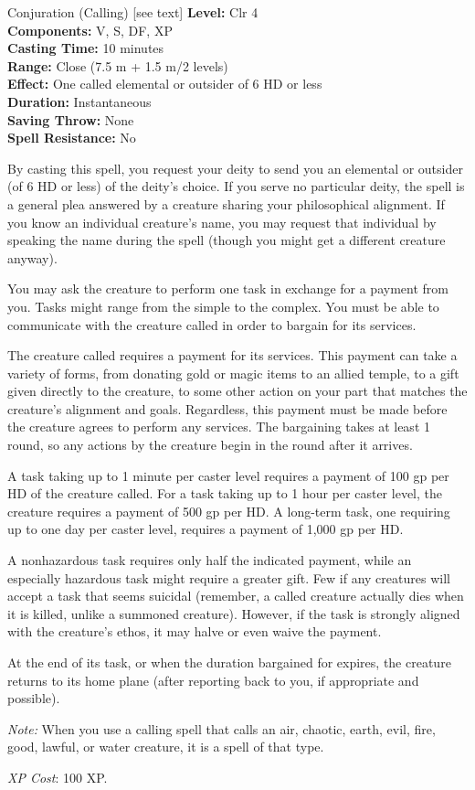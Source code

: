 {Conjuration (Calling) [see text]}
{
	\textbf{Level:}
	Clr 4\\
	\textbf{Components:}
	V, S, DF, XP\\
	\textbf{Casting Time:}
	10 minutes\\
	\textbf{Range:}
	Close (7.5 m + 1.5 m/2 levels)\\
	\textbf{Effect:}
	One called elemental or outsider of 6 HD or less\\
	\textbf{Duration:}
	Instantaneous\\
	\textbf{Saving Throw:}
	None\\
	\textbf{Spell Resistance:}
	No\\
}
{
	By casting this spell, you request your deity to send you an elemental or outsider (of 6 HD or less) of the deity's choice. If you serve no particular deity, the spell is a general plea answered by a creature sharing your philosophical alignment. If you know an individual creature's name, you may request that individual by speaking the name during the spell (though you might get a different creature anyway).

	You may ask the creature to perform one task in exchange for a payment from you. Tasks might range from the simple to the complex. You must be able to communicate with the creature called in order to bargain for its services.

	The creature called requires a payment for its services. This payment can take a variety of forms, from donating gold or magic items to an allied temple, to a gift given directly to the creature, to some other action on your part that matches the creature's alignment and goals. Regardless, this payment must be made before the creature agrees to perform any services. The bargaining takes at least 1 round, so any actions by the creature begin in the round after it arrives.

	A task taking up to 1 minute per caster level requires a payment of 100 gp per HD of the creature called. For a task taking up to 1 hour per caster level, the creature requires a payment of 500 gp per HD. A long-term task, one requiring up to one day per caster level, requires a payment of 1,000 gp per HD.

	A nonhazardous task requires only half the indicated payment, while an especially hazardous task might require a greater gift. Few if any creatures will accept a task that seems suicidal (remember, a called creature actually dies when it is killed, unlike a summoned creature). However, if the task is strongly aligned with the creature's ethos, it may halve or even waive the payment.

	At the end of its task, or when the duration bargained for expires, the creature returns to its home plane (after reporting back to you, if appropriate and possible).

	\textit{Note:} When you use a calling spell that calls an air, chaotic, earth, evil, fire, good, lawful, or water creature, it is a spell of that type.

	\textit{XP Cost}:
	100 XP.

}
